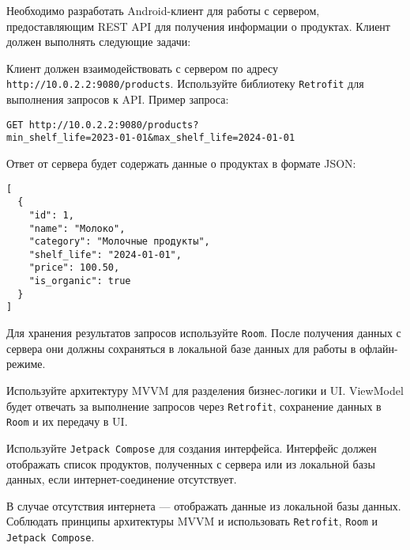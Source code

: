
Необходимо разработать Android-клиент для работы с сервером, предоставляющим REST API для получения информации о продуктах. Клиент должен выполнять следующие задачи:

Клиент должен взаимодействовать с сервером по адресу \texttt{http://10.0.2.2:9080/products}. Используйте библиотеку \texttt{Retrofit} для выполнения запросов к API. Пример запроса:

\begin{verbatim}
GET http://10.0.2.2:9080/products?
min_shelf_life=2023-01-01&max_shelf_life=2024-01-01
\end{verbatim}

Ответ от сервера будет содержать данные о продуктах в формате JSON:

\begin{verbatim}
[
  {
    "id": 1,
    "name": "Молоко",
    "category": "Молочные продукты",
    "shelf_life": "2024-01-01",
    "price": 100.50,
    "is_organic": true
  }
]
\end{verbatim}

Для хранения результатов запросов используйте \texttt{Room}. После получения данных с сервера они должны сохраняться в локальной базе данных для работы в офлайн-режиме.

Используйте архитектуру MVVM для разделения бизнес-логики и UI. ViewModel будет отвечать за выполнение запросов через \texttt{Retrofit}, сохранение данных в \texttt{Room} и их передачу в UI.

Используйте \texttt{Jetpack Compose} для создания интерфейса. Интерфейс должен отображать список продуктов, полученных с сервера или из локальной базы данных, если интернет-соединение отсутствует.

В случае отсутствия интернета — отображать данные из локальной базы данных.
Соблюдать принципы архитектуры MVVM и использовать \texttt{Retrofit}, \texttt{Room} и \texttt{Jetpack Compose}.
